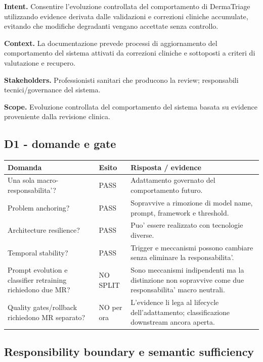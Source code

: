 \documentclass[11pt,a4paper]{article}
\begin{document}
\begin{ddtacore}[title={MR-04 - Adattamento controllato sulla base della revisione clinica}]
\textbf{Intent.} Consentire l'evoluzione controllata del comportamento di DermaTriage utilizzando evidence derivata dalle validazioni e correzioni cliniche accumulate, evitando che modifiche degradanti vengano accettate senza controllo.

\textbf{Context.} La documentazione prevede processi di aggiornamento del comportamento del sistema attivati da correzioni cliniche e sottoposti a criteri di valutazione e recupero.

\textbf{Stakeholders.} Professionisti sanitari che producono la review; responsabili tecnici/governance del sistema.

\textbf{Scope.} Evoluzione controllata del comportamento del sistema basata su evidence proveniente dalla revisione clinica.
\end{ddtacore}

\subsection{D1 - domande e gate}

\begin{tabularx}{\textwidth}{L{62mm}L{21mm}Y}
\toprule
\textbf{Domanda} & \textbf{Esito} & \textbf{Risposta / evidence} \\
\midrule
Una sola macro-responsabilita'? & PASS & Adattamento governato del comportamento futuro. \\
Problem anchoring? & PASS & Sopravvive a rimozione di model name, prompt, framework e threshold. \\
Architecture resilience? & PASS & Puo' essere realizzato con tecnologie diverse. \\
Temporal stability? & PASS & Trigger e meccanismi possono cambiare senza eliminare la responsabilita'. \\
Prompt evolution e classifier retraining richiedono due MR? & NO SPLIT & Sono meccanismi indipendenti ma la distinzione non sopravvive come due responsabilita' macro neutrali. \\
Quality gates/rollback richiedono MR separato? & NO per ora & L'evidence li lega al lifecycle dell'adattamento; classificazione downstream ancora aperta. \\
\bottomrule
\end{tabularx}

\subsection{Responsibility boundary e semantic sufficiency}
\end{document}
